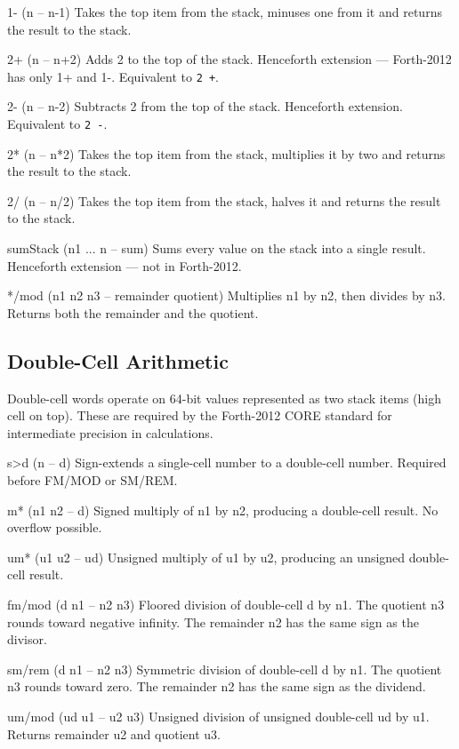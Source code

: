 \documentclass[a4paper, 11pt, openany]{book}
\begin{document}
\begin{forthbox}
  1-       (n -- n-1)
           Takes the top item from the stack, minuses one from it
           and returns the result to the stack.

  2+       (n -- n+2)
           Adds 2 to the top of the stack. Henceforth extension ---
           Forth-2012 has only 1+ and 1-. Equivalent to \texttt{2 +}.

  2-       (n -- n-2)
           Subtracts 2 from the top of the stack. Henceforth
           extension. Equivalent to \texttt{2 -}.

  2*       (n -- n*2)
           Takes the top item from the stack, multiplies it by
           two and returns the result to the stack.

  2/       (n -- n/2)
           Takes the top item from the stack, halves it and
           returns the result to the stack.

  sumStack (n1 ... n -- sum)
           Sums every value on the stack into a single result.
           Henceforth extension --- not in Forth-2012.

  */mod    (n1 n2 n3 -- remainder quotient)
           Multiplies n1 by n2, then divides by n3. Returns
           both the remainder and the quotient.
\end{forthbox}

\subsection{Double-Cell Arithmetic}

Double-cell words operate on 64-bit values represented as two stack items (high cell on top). These are required by the Forth-2012 CORE standard for intermediate precision in calculations.

\begin{forthbox}
  s>d      (n -- d)
           Sign-extends a single-cell number to a double-cell
           number. Required before FM/MOD or SM/REM.

  m*       (n1 n2 -- d)
           Signed multiply of n1 by n2, producing a double-cell
           result. No overflow possible.

  um*      (u1 u2 -- ud)
           Unsigned multiply of u1 by u2, producing an unsigned
           double-cell result.

  fm/mod   (d n1 -- n2 n3)
           Floored division of double-cell d by n1. The quotient
           n3 rounds toward negative infinity. The remainder n2
           has the same sign as the divisor.

  sm/rem   (d n1 -- n2 n3)
           Symmetric division of double-cell d by n1. The
           quotient n3 rounds toward zero. The remainder n2 has
           the same sign as the dividend.

  um/mod   (ud u1 -- u2 u3)
           Unsigned division of unsigned double-cell ud by u1.
           Returns remainder u2 and quotient u3.
\end{forthbox}
\end{document}
